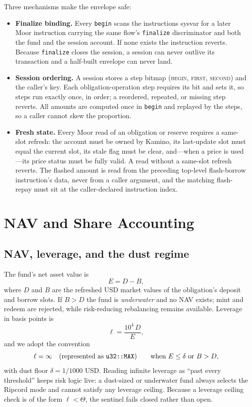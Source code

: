 \documentclass[11pt]{article}
\theoremstyle{remark}
\newcommand{\BPS}{10^{4}}
\newcommand{\NAV}{E}
\newcommand{\Lev}{\ell}
\begin{document}
Three mechanisms make the envelope safe:

\begin{itemize}
\item \textbf{Finalize binding.} Every \texttt{begin} scans the instructions sysvar for a later Moor instruction carrying the same flow's \texttt{finalize} discriminator and both the fund and the session account. If none exists the instruction reverts. Because \texttt{finalize} closes the session, a session can never outlive its transaction and a half-built envelope can never land.
\item \textbf{Session ordering.} A session stores a step bitmap (\textsc{begin}, \textsc{first}, \textsc{second}) and the caller's key. Each obligation-operation step requires its bit and sets it, so steps run exactly once, in order; a reordered, repeated, or missing step reverts. All amounts are computed once in \texttt{begin} and replayed by the steps, so a caller cannot skew the proportion.
\item \textbf{Fresh state.} Every Moor read of an obligation or reserve requires a same-slot refresh: the account must be owned by Kamino, its last-update slot must equal the current slot, its stale flag must be clear, and---when a price is used---its price status must be fully valid. A read without a same-slot refresh reverts. The flashed amount is read from the preceding top-level flash-borrow instruction's data, never from a caller argument, and the matching flash-repay must sit at the caller-declared instruction index.
\end{itemize}

\section{NAV and Share Accounting}
\label{sec:nav}

\subsection{NAV, leverage, and the dust regime}

The fund's net asset value is
\begin{equation}
\NAV = D - B,
\label{eq:nav}
\end{equation}
where $D$ and $B$ are the refreshed USD market values of the obligation's deposit and borrow slots. If $B > D$ the fund is \emph{underwater} and no NAV exists; mint and redeem are rejected, while risk-reducing rebalancing remains available. Leverage in basis points is
\begin{equation}
\Lev = \frac{\BPS\,D}{\NAV},
\label{eq:leverage}
\end{equation}
and we adopt the convention
\begin{equation}
\Lev = \infty \quad\text{(represented as \texttt{u32::MAX})}
\qquad\text{when } \NAV \le \delta \ \text{or } B > D,
\end{equation}
with dust floor $\delta = 1/1000$ USD. Reading infinite leverage as ``past every threshold'' keeps risk logic live: a dust-sized or underwater fund always selects the Ripcord mode and cannot satisfy any leverage ceiling. Because a leverage ceiling check is of the form $\Lev < \Theta$, the sentinel fails closed rather than open.
\end{document}
